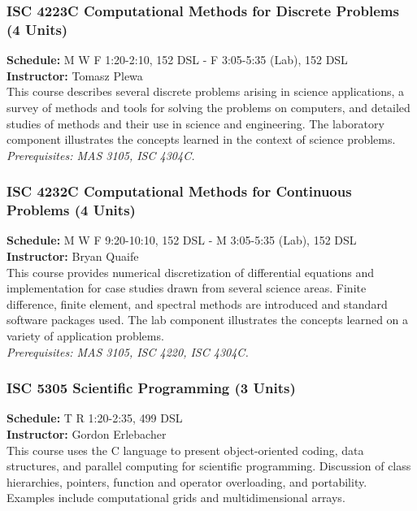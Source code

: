 \documentclass[12pt,a4paper]{article}
\begin{document}
\subsubsection*{ISC 4223C Computational Methods for Discrete Problems (4 Units)}
\textbf{Schedule:} M W F 1:20-2:10, 152 DSL - F 3:05-5:35 (Lab), 152 DSL \\
\textbf{Instructor:} Tomasz Plewa \\
This course describes several discrete problems arising in science applications, a survey of methods and tools for solving the problems on computers, and detailed studies of methods and their use in science and engineering. The laboratory component illustrates the concepts learned in the context of science problems. \\
\textit{Prerequisites: MAS 3105, ISC 4304C.}

\subsubsection*{ISC 4232C Computational Methods for Continuous Problems (4 Units)}
\textbf{Schedule:} M W F 9:20-10:10, 152 DSL - M 3:05-5:35 (Lab), 152 DSL \\
\textbf{Instructor:} Bryan Quaife \\
This course provides numerical discretization of differential equations and implementation for case studies drawn from several science areas. Finite difference, finite element, and spectral methods are introduced and standard software packages used. The lab component illustrates the concepts learned on a variety of application problems. \\
\textit{Prerequisites: MAS 3105, ISC 4220, ISC 4304C.}

\subsubsection*{ISC 5305 Scientific Programming (3 Units)}
\textbf{Schedule:} T R 1:20-2:35, 499 DSL \\
\textbf{Instructor:} Gordon Erlebacher \\
This course uses the C language to present object-oriented coding, data structures, and parallel computing for scientific programming. Discussion of class hierarchies, pointers, function and operator overloading, and portability. Examples include computational grids and multidimensional arrays.
\end{document}
